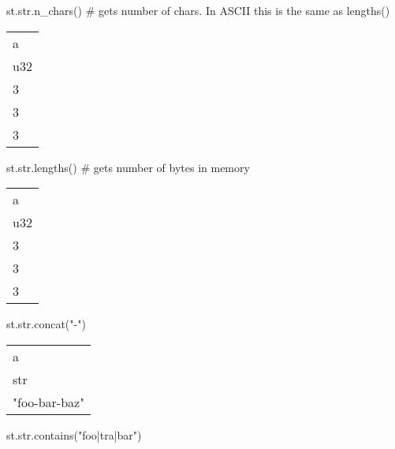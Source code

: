 \documentclass[
  letterpaper,
  DIV=11,
  numbers=noendperiod]{scrartcl}
\newenvironment{Shaded}{\begin{snugshade}}{\end{snugshade}}
\newcommand{\BuiltInTok}[1]{\textcolor[rgb]{0.00,0.23,0.31}{#1}}
\newcommand{\CommentTok}[1]{\textcolor[rgb]{0.37,0.37,0.37}{#1}}
\newcommand{\NormalTok}[1]{\textcolor[rgb]{0.00,0.23,0.31}{#1}}
\newcommand{\StringTok}[1]{\textcolor[rgb]{0.13,0.47,0.30}{#1}}
\begin{document}
\begin{Shaded}
\begin{Highlighting}[]
\NormalTok{st.}\BuiltInTok{str}\NormalTok{.n\_chars() }\CommentTok{\# gets number of chars. In ASCII this is the same as lengths()}
\end{Highlighting}
\end{Shaded}

\begin{longtable}[]{@{}l@{}}
\toprule()
a \\
u32 \\
\midrule()
\endhead
3 \\
3 \\
3 \\
\bottomrule()
\end{longtable}

\begin{Shaded}
\begin{Highlighting}[]
\NormalTok{st.}\BuiltInTok{str}\NormalTok{.lengths() }\CommentTok{\# gets number of bytes in memory}
\end{Highlighting}
\end{Shaded}

\begin{longtable}[]{@{}l@{}}
\toprule()
a \\
u32 \\
\midrule()
\endhead
3 \\
3 \\
3 \\
\bottomrule()
\end{longtable}

\begin{Shaded}
\begin{Highlighting}[]
\NormalTok{st.}\BuiltInTok{str}\NormalTok{.concat(}\StringTok{"{-}"}\NormalTok{)}
\end{Highlighting}
\end{Shaded}

\begin{longtable}[]{@{}l@{}}
\toprule()
a \\
str \\
\midrule()
\endhead
"foo-bar-baz" \\
\bottomrule()
\end{longtable}

\begin{Shaded}
\begin{Highlighting}[]
\NormalTok{st.}\BuiltInTok{str}\NormalTok{.contains(}\StringTok{"foo|tra|bar"}\NormalTok{)}
\end{Highlighting}
\end{Shaded}
\end{document}
